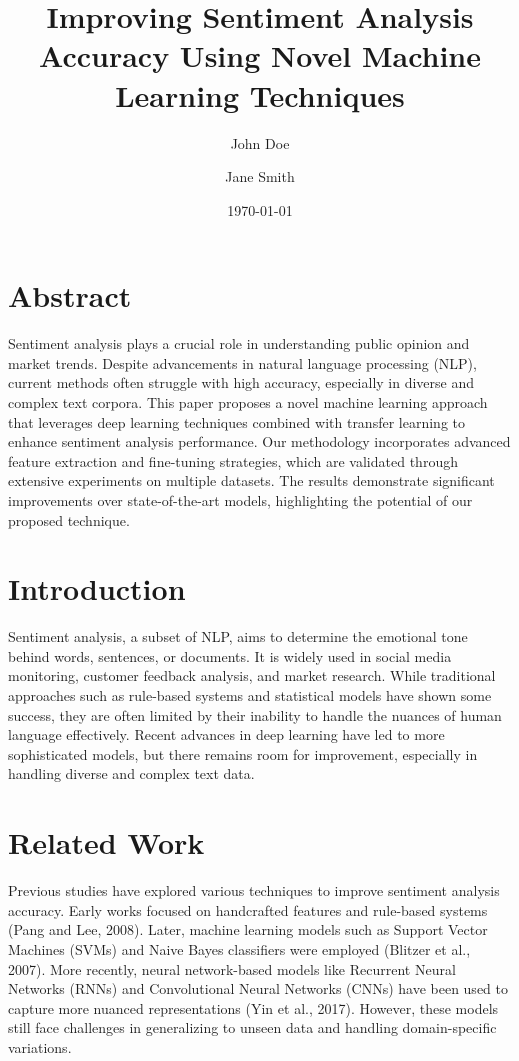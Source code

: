 \documentclass{article}
\title{Improving Sentiment Analysis Accuracy Using Novel Machine Learning Techniques}
\author{John Doe \and Jane Smith}
\date{\today}
\begin{document}
\maketitle

\section{Abstract}
Sentiment analysis plays a crucial role in understanding public opinion and market trends. Despite advancements in natural language processing (NLP), current methods often struggle with high accuracy, especially in diverse and complex text corpora. This paper proposes a novel machine learning approach that leverages deep learning techniques combined with transfer learning to enhance sentiment analysis performance. Our methodology incorporates advanced feature extraction and fine-tuning strategies, which are validated through extensive experiments on multiple datasets. The results demonstrate significant improvements over state-of-the-art models, highlighting the potential of our proposed technique.

\section{Introduction}
Sentiment analysis, a subset of NLP, aims to determine the emotional tone behind words, sentences, or documents. It is widely used in social media monitoring, customer feedback analysis, and market research. While traditional approaches such as rule-based systems and statistical models have shown some success, they are often limited by their inability to handle the nuances of human language effectively. Recent advances in deep learning have led to more sophisticated models, but there remains room for improvement, especially in handling diverse and complex text data.

\section{Related Work}
Previous studies have explored various techniques to improve sentiment analysis accuracy. Early works focused on handcrafted features and rule-based systems (Pang and Lee, 2008). Later, machine learning models such as Support Vector Machines (SVMs) and Naive Bayes classifiers were employed (Blitzer et al., 2007). More recently, neural network-based models like Recurrent Neural Networks (RNNs) and Convolutional Neural Networks (CNNs) have been used to capture more nuanced representations (Yin et al., 2017). However, these models still face challenges in generalizing to unseen data and handling domain-specific variations.
\end{document}
